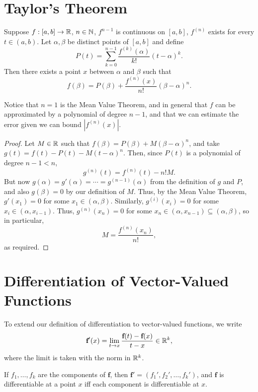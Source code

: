 \section{Taylor's Theorem}

\begin{theorem} %
    Suppose $f: [a, b] \rightarrow \mathbb{R}$, $n \in \mathbb{N}$, $f^{n-1}$ is continuous on $[a, b]$, $f^{(n)}$ exists for every $t \in (a, b)$. Let $\alpha, \beta$ be distinct points of $[a, b]$ and define
    \[
        P(t) = \sum_{k=0}^{n-1} \frac{f^{(k)}(\alpha)}{k!} (t - \alpha)^k.
    \]
    Then there exists a point $x$ between $\alpha$ and $\beta$ such that
    \[
        f(\beta) = P(\beta) + \frac{f^{(n)}(x)}{n!} (\beta - \alpha)^n.
    \]

    Notice that $n = 1$ is the Mean Value Theorem, and in general that $f$ can be approximated by a polynomial of degree $n - 1$, and that we can estimate the error given we can bound $|f^{(n)}(x)|$.

    \begin{proof}
        Let $M \in \mathbb{R}$ such that $f(\beta) = P(\beta) + M(\beta - \alpha)^n$, and take $g(t) = f(t) - P(t) - M(t - \alpha)^n$. Then, since $P(t)$ is a polynomial of degree $n - 1 < n$, 
        \[
            g^{(n)}(t) = f^{(n)}(t) - n! M.
        \]
        But now $g(\alpha) = g'(\alpha) = \dotsb = g^{(n-1)}(\alpha)$ from the definition of $g$ and $P$, and also $g(\beta) = 0$ by our definition of $M$. Thus, by the Mean Value Theorem, $g'(x_1) = 0$ for some $x_1 \in (\alpha, \beta)$. Similarly, $g^{(i)}(x_i) = 0$ for some $x_i \in (\alpha, x_{i-1})$. Thus, $g^{(n)}(x_n) = 0$ for some $x_n \in (\alpha, x_{n-1}) \subseteq (\alpha, \beta)$, so in particular,
        \[
            M = \frac{f^{(n)}(x_n)}{n!},
        \]
        as required.
    \end{proof}
\end{theorem}

\section{Differentiation of Vector-Valued Functions}

To extend our definition of differentiation to vector-valued functions, we write
\[
    \textbf{f}'(x) = \lim_{t \rightarrow x} \frac{\textbf{f}(t) - \textbf{f}(x)}{t - x} \in \mathbb{R}^k,
\]
where the limit is taken with the norm in $\mathbb{R}^k$.

If $f_1, \dotsc, f_k$ are the components of $\textbf{f}$, then $\textbf{f}' = (f_1', f_2', \dotsc, f_k')$, and $\textbf{f}$ is differentiable at a point $x$ iff each component is differentiable at $x$.


